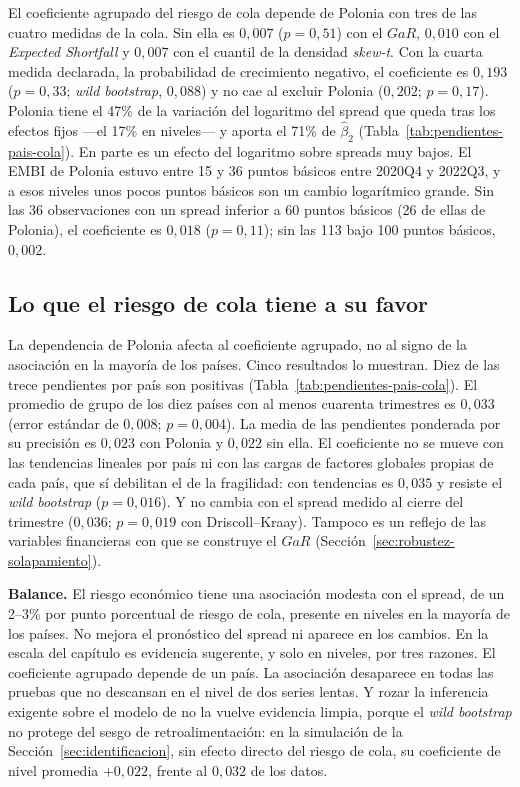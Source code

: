 El coeficiente agrupado del riesgo de cola depende de Polonia con tres de las cuatro medidas de la cola. Sin ella es $0{,}007$ ($p=0{,}51$) con el $GaR$, $0{,}010$ con el \textit{Expected Shortfall} y $0{,}007$ con el cuantil de la densidad \textit{skew-t}. Con la cuarta medida declarada, la probabilidad de crecimiento negativo, el coeficiente es $0{,}193$ ($p=0{,}33$; \textit{wild bootstrap}, $0{,}088$) y no cae al excluir Polonia ($0{,}202$; $p=0{,}17$). Polonia tiene el 47\% de la variación del logaritmo del spread que queda tras los efectos fijos ---el 17\% en niveles--- y aporta el 71\% de $\hat\beta_2$ (Tabla~\ref{tab:pendientes-pais-cola}). En parte es un efecto del logaritmo sobre spreads muy bajos. El EMBI de Polonia estuvo entre 15 y 36 puntos básicos entre 2020Q4 y 2022Q3, y a esos niveles unos pocos puntos básicos son un cambio logarítmico grande. Sin las 36 observaciones con un spread inferior a 60 puntos básicos (26 de ellas de Polonia), el coeficiente es $0{,}018$ ($p=0{,}11$); sin las 113 bajo 100 puntos básicos, $0{,}002$.

\subsection{Lo que el riesgo de cola tiene a su favor}

La dependencia de Polonia afecta al coeficiente agrupado, no al signo de la asociación en la mayoría de los países. Cinco resultados lo muestran. Diez de las trece pendientes por país son positivas (Tabla~\ref{tab:pendientes-pais-cola}). El promedio de grupo de los diez países con al menos cuarenta trimestres es $0{,}033$ (error estándar de $0{,}008$; $p=0{,}004$). La media de las pendientes ponderada por su precisión es $0{,}023$ con Polonia y $0{,}022$ sin ella. El coeficiente no se mueve con las tendencias lineales por país ni con las cargas de factores globales propias de cada país, que sí debilitan el de la fragilidad: con tendencias es $0{,}035$ y resiste el \textit{wild bootstrap} ($p=0{,}016$). Y no cambia con el spread medido al cierre del trimestre ($0{,}036$; $p=0{,}019$ con Driscoll--Kraay). Tampoco es un reflejo de las variables financieras con que se construye el $GaR$ (Sección~\ref{sec:robustez-solapamiento}).

\textbf{Balance.} El riesgo económico tiene una asociación modesta con el spread, de un 2--3\% por punto porcentual de riesgo de cola, presente en niveles en la mayoría de los países. No mejora el pronóstico del spread ni aparece en los cambios. En la escala del capítulo es evidencia sugerente, y solo en niveles, por tres razones. El coeficiente agrupado depende de un país. La asociación desaparece en todas las pruebas que no descansan en el nivel de dos series lentas. Y rozar la inferencia exigente sobre el modelo de \citet{Chari2024b} no la vuelve evidencia limpia, porque el \textit{wild bootstrap} no protege del sesgo de retroalimentación: en la simulación de la Sección~\ref{sec:identificacion}, sin efecto directo del riesgo de cola, su coeficiente de nivel promedia $+0{,}022$, frente al $0{,}032$ de los datos.

